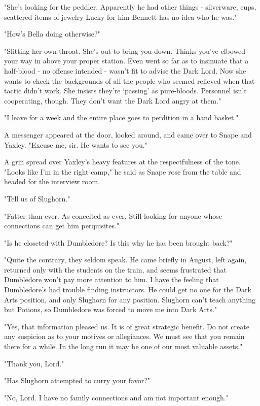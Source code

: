 "She's looking for the peddler. Apparently he had other things - silverware, cups, scattered items of jewelry{\el} Lucky for him Bennett has no idea who he was."

"How's Bella doing otherwise?"

"Slitting her own throat. She's out to bring you down. Thinks you've elbowed your way in above your proper station. Even went so far as to insinuate that a half-blood - no offense intended - wasn't fit to advise the Dark Lord. Now she wants to check the backgrounds of all the people who seemed relieved when that tactic didn't work. She insists they're `passing' as pure-bloods. Personnel isn't cooperating, though. They don't want the Dark Lord angry at them."

"I leave for a week and the entire place goes to perdition in a hand basket."

A messenger appeared at the door, looked around, and came over to Snape and Yaxley. "Excuse me, sir. He wants to see you."

A grin spread over Yaxley's heavy features at the respectfulness of the tone. "Looks like I'm in the right camp," he said as Snape rose from the table and headed for the interview room.

"Tell us of Slughorn."

"Fatter than ever. As conceited as ever. Still looking for anyone whose connections can get him perquisites."

"Is he closeted with Dumbledore? Is this why he has been brought back?"

"Quite the contrary, they seldom speak. He came briefly in August, left again, returned only with the students on the train, and seems frustrated that Dumbledore won't pay more attention to him. I have the feeling that Dumbledore's had trouble finding instructors. He could get no one for the Dark Arts position, and only Slughorn for any position. Slughorn can't teach anything but Potions, so Dumbledore was forced to move me into Dark Arts."

"Yes, that information pleased us. It is of great strategic benefit. Do not create any suspicion as to your motives or allegiances. We must see that you remain there for a while. In the long run it may be one of our most valuable assets."

"Thank you, Lord."

"Has Slughorn attempted to curry your favor?"

"No, Lord. I have no family connections and am not important enough."

